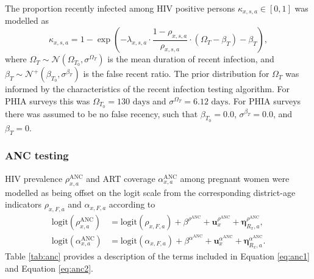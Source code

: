 \documentclass[a4paper, nobind]{templates/ociamthesis}
\begin{document}
The proportion recently infected among HIV positive persons \(\kappa_{x, s, a} \in [0, 1]\) was modelled as
\begin{equation}
\kappa_{x, s, a} = 1 - \exp \left(- \lambda_{x, s, a} \cdot \frac{1 - \rho_{x, s, a}}{\rho_{x, s, a}} \cdot (\Omega_T - \beta_T ) - \beta_T \right),
\end{equation}
where \(\Omega_T \sim \mathcal{N}(\Omega_{T_0}, \sigma^{\Omega_T})\) is the mean duration of recent infection, and \(\beta_T \sim \mathcal{N}^{+}(\beta_{T_0}, \sigma^{\beta_T})\) is the false recent ratio.
The prior distribution for \(\Omega_T\) was informed by the characteristics of the recent infection testing algorithm.
For PHIA surveys this was \(\Omega_{T_0} = 130 \text{ days}\) and \(\sigma^{\Omega_T} = 6.12 \text{ days}\).
For PHIA surveys there was assumed to be no false recency, such that \(\beta_{T_0} = 0.0\), \(\sigma^{\beta_T} = 0.0\), and \(\beta_T = 0\).

\hypertarget{anc-test}{%
\subsubsection{ANC testing}\label{anc-test}}

HIV prevalence \(\rho_{x, a}^\text{ANC}\) and ART coverage \(\alpha_{x, a}^\text{ANC}\) among pregnant women were modelled as being offset on the logit scale from the corresponding district-age indicators \(\rho_{x, F, a}\) and \(\alpha_{x, F, a}\) according to
\begin{align}
\text{logit}(\rho_{x, a}^{\text{ANC}}) &= \text{logit}(\rho_{x, F, a}) + \beta^{\rho^{\text{ANC}}} + \mathbf{u}_x^{\rho^{\text{ANC}}} + \boldsymbol{\mathbf{\eta}}_{R_x, a}^{\rho^{\text{ANC}}}, \label{eq:anc1} \\
\text{logit}(\alpha_{x, a}^{\text{ANC}}) &= \text{logit}(\alpha_{x, F, a}) + \beta^{\alpha^{\text{ANC}}} + \mathbf{u}_x^{\alpha^{\text{ANC}}} + \boldsymbol{\mathbf{\eta}}_{R_x, a}^{\alpha^{\text{ANC}}} \label{eq:anc2}.
\end{align}
Table \ref{tab:anc} provides a description of the terms included in Equation \eqref{eq:anc1} and Equation \eqref{eq:anc2}.
\end{document}
